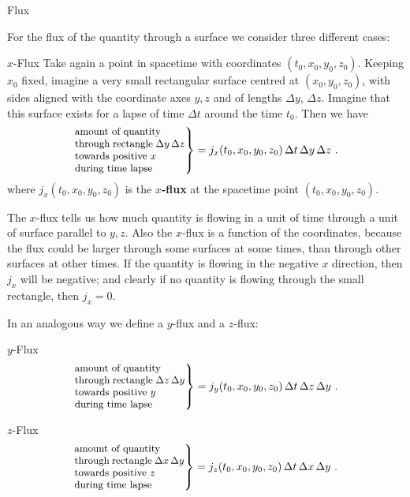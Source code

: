 \documentclass[a4paper,12pt,%
onecolumn,oneside,titlepage,%
british%
]{memoir}
\newcommand*{\incr}{\Delta}%
\renewcommand*{\|}[1][]{\nonscript\:#1\vert\nonscript\:\mathopen{}}
\newcommand*{\yti}{t_{0}}
\newcommand*{\yxi}{x_{0}}
\newcommand*{\yyi}{y_{0}}
\newcommand*{\yzi}{z_{0}}
\newcommand*{\Dt}{\incr t}
\newcommand*{\Dx}{\incr x}
\newcommand*{\Dy}{\incr y}
\newcommand*{\Dz}{\incr z}
\begin{document}
\medskip


\begin{warning}
  Flux
\end{warning}

For the flux of the quantity through a surface we consider three different cases:
\begin{definition}{$x$-Flux}
  Take again a point in spacetime with coordinates $(\yti,\yxi,\yyi,\yzi)$. Keeping $\yxi$ fixed, imagine a very small rectangular surface centred at $(\yxi,\yyi,\yzi)$, with sides aligned with the coordinate axes $y,z$ and of lengths $\Dy$, $\Dz$. Imagine that this surface exists for a lapse of time $\Dt$ around the time $\yti$. Then we have
  \begin{equation}
    \label{neq:xflux_expl}
    \left.\parbox[c]{10em}{\small amount of quantity\\ through rectangle $\Dy\,\Dz$\\ towards positive $x$\\during time lapse }\right\} =
    j_{x}(\yti,\yxi,\yyi,\yzi)\, \Dt\, \Dy\, \Dz \ .
  \end{equation}
  where $j_{x}(\yti,\yxi,\yyi,\yzi)$ is the \textbf{$x$-flux} at the spacetime point $(\yti,\yxi,\yyi,\yzi)$.
\end{definition}
The $x$-flux tells us how much quantity is flowing in a unit of time through a unit of surface parallel to $y,z$. Also the $x$-flux is a function of the coordinates, because the flux could be larger through some surfaces at some times, than through other surfaces at other times. If the quantity is flowing in the negative $x$ direction, then $j_{x}$ will be negative; and clearly if no quantity is flowing through the small rectangle, then $j_{x}=0$.

In an analogous way we define a $y$-flux and a $z$-flux:

\begin{definition}{$y$-Flux}
  \begin{equation}
    \label{neq:yflux_expl}
    \left.\parbox[c]{10em}{\small amount of quantity\\ through rectangle $\Dz\,\Dy$\\ towards positive $y$\\during time lapse }\right\} =
    j_{y}(\yti,\yxi,\yyi,\yzi)\, \Dt\, \Dz\, \Dy \ .
  \end{equation}
\end{definition}
\begin{definition}{$z$-Flux}
  \begin{equation}
    \label{neq:zflux_expl}
    \left.\parbox[c]{10em}{\small amount of quantity\\ through rectangle $\Dx\,\Dy$\\ towards positive $z$\\during time lapse }\right\} =
    j_{z}(\yti,\yxi,\yyi,\yzi)\, \Dt\, \Dx\, \Dy \ .
  \end{equation}
\end{definition}
\end{document}
